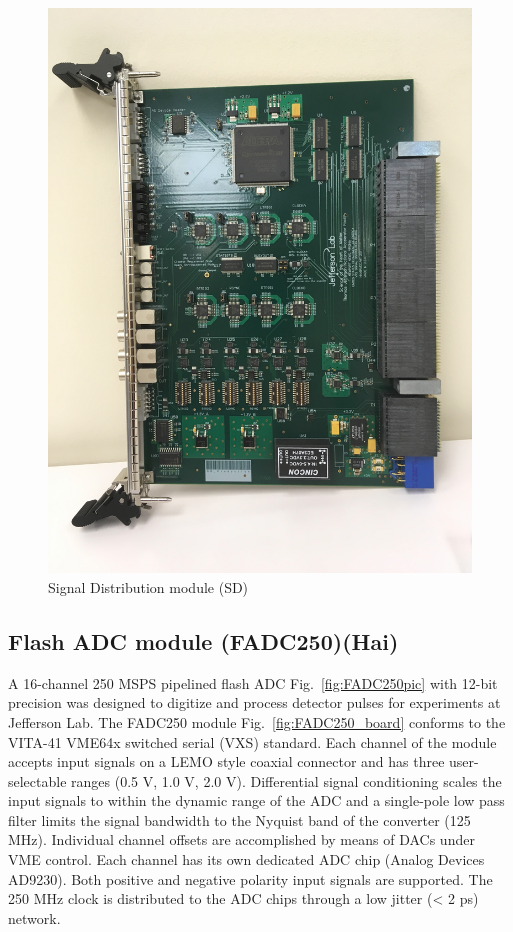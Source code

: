 \begin{figure}[hbt]
	\centering
	\includegraphics[width=1.0\columnwidth,keepaspectratio]{img/sd_board.jpg}
	\caption{Signal Distribution module (SD)}
	\label{fig:SDpic}
\end{figure}


\subsection{Flash ADC module (FADC250)(Hai)}

A 16-channel 250 MSPS pipelined flash ADC Fig.~\ref{fig:FADC250pic} with 12-bit precision was designed to digitize and process detector pulses for experiments at Jefferson Lab.  The FADC250 module Fig.~\ref{fig:FADC250_board} conforms to the VITA-41 VME64x switched serial (VXS) standard.  Each channel of the module accepts input signals on a LEMO style coaxial connector and has three user-selectable ranges (0.5 V, 1.0 V, 2.0 V).  Differential signal conditioning scales the input signals to within the dynamic range of the ADC and a single-pole low pass filter limits the signal bandwidth to the Nyquist band of the converter (125 MHz). Individual channel offsets are accomplished by means of DACs under VME control.  Each channel has its own dedicated ADC chip (Analog Devices AD9230). Both positive and negative polarity input signals are supported. The 250 MHz clock is distributed to the ADC chips through a low jitter (< 2 ps) network.  

